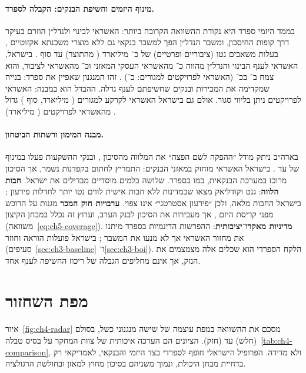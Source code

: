 \paragraph{מינוף היזמים וחשיפת הבנקים: הקבלה לספרד.}\label{subsec:ch4-developers}
בממד היזמי ספרד היא נקודת ההשוואה הקרובה ביותר: האשראי לבינוי ולנדל״ן הוזרם בעיקר דרך קופות החיסכון, ומשבר הנדל״ן הפך למשבר בנקאי גם ללא מוצרי משכנתא אקזוטיים \cite{akin2014}, בעלות משאבים נטו (ציבוריים ופרטיים) של כ־ מיליארד ( מהתוצר) עד סוף  \cite{bde2017note}. בישראל, האשראי לענף הבינוי והנדל״ן מהווה כ־ מהאשראי העסקי המאזני וכ־ מהאשראי לציבור, והוא צמח ב־ בכ־ (האשראי לפרויקטים למגורים: כ־) \cite{boi2026_recredit}. זהו המנגנון שאפיין את ספרד: בנייה שמקדימה את המכירות ובנקים שחשיפתם לענף גדלה. ההבדל הוא במבנה: האשראי לפרויקטים ניתן בליווי סגור. אולם גם בישראל האשראי לקרקע למגורים ( מיליארד, סוף ) גדול מהאשראי לפרויקטים ( מיליארד) \cite{boi_survey2025}.

\paragraph{מבנה המימון ורשתות הביטחון.}\label{subsec:ch4-safety}
בארה״ב ניתק מודל ״ההפקה לשם הפצה״ את המלווה מהסיכון \cite{keys2010}, ובנקי ההשקעות פעלו במינוף של עד  \cite{fcic2011}. בישראל האשראי מוחזק במאזני הבנקים: התמריץ לחתום בקפדנות נשמר, אך הסיכון מרוכז במערכת הבנקאית, כמו בספרד. שלושה בלמים מוסדיים מבדילים את ישראל. \textbf{חבות הלווה}: גנט וקודליאק מצאו שבמדינות ללא חבות אישית לווים נטו יותר לחדלות פירעון \cite{ghent2011}; בישראל החבות מלאה, ולכן ״פירעון אסטרטגי״ אינו צפוי. \textbf{ערבויות חוק המכר} מגנות על הרוכש מפני קריסת היזם \cite{salelaw1974}, אך מעבירות את הסיכון לבנק הערב, וערוץ זה נכלל במבחן הקיצון (משוואה~\ref{eq:ch5-coverage}). \textbf{מדיניות מאקרו־יציבותית}: ההפרשות הדינמיות בספרד מיתנו את מחזור האשראי \cite{jimenez2017} אך לא מנעו את המשבר \cite{bde2017}; בישראל פועלות הוראה  וחוזר  (סעיפים~\ref{sec:ch3-baseline} ו־\ref{sec:ch3-boi}). הלקח הספרדי הוא שכלים אלה מצמצמים את הנזק, אך אינם מחליפים הגבלה של ריכוז החשיפה לענף אחד.

\section{מפת השחזור}
\label{sec:ch4-replication}

איור~\ref{fig:ch4-radar} מסכם את ההשוואה במפת עוצמה של שישה מנגנוני כשל, בסולם  (חלש) עד  (חזק). הציונים הם הערכה איכותית של צוות המחקר על בסיס טבלה~\ref{tab:ch4-comparison}, ולא מדידה. הפרופיל הישראלי חופף לספרדי בצד היזמי והבנקאי, לאמריקאי רק בדחיית מבחן היכולת, ונמוך משניהם בסיכון מחוץ למאזן ובחולשת הרגולציה.

